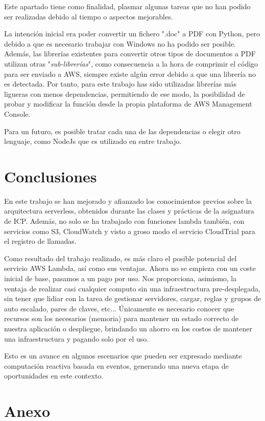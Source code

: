 \documentclass[
]{article}
\begin{document}
Este apartado tiene como finalidad, plasmar algunas tareas que no han
podido ser realizadas debido al tiempo o aspectos mejorables.

La intención inicial era poder convertir un fichero ".doc" a PDF con
Python, pero debido a que es necesario trabajar con Windows no ha podido
ser posible. Además, las librerías existentes para convertir otros tipos
de documentos a PDF utilizan otras "\emph{sub-librerías}", como
consecuencia a la hora de comprimir el código para ser enviado a AWS,
siempre existe algún error debido a que una librería no es detectada.
Por tanto, para este trabajo has sido utilizadas librerías más ligueras
con menos dependencias, permitiendo de ese modo, la posibilidad de
probar y modificar la función desde la propia plataforma de AWS
Management Console.

Para un futuro, es posible tratar cada una de las dependencias o elegir
otro lenguaje, como NodeJs que es utilizado en entre trabajo.

\hypertarget{header-n210}{%
\section{Conclusiones}\label{header-n210}}
En este trabajo se han mejorado y afianzado los conocimientos previos sobre la arquitectura serverless, obtenidos durante las clases y prácticas de la asignatura de ICP. Además, no solo se ha trabajado con funciones lambda también, con servicios como S3, CloudWatch y visto a groso modo el servicio CloudTrial para el registro de llamadas. 

Como resultado del trabajo realizado, es más claro el posible potencial del servicio AWS Lambda, así como sus ventajas. Ahora no se empieza con un coste inicial de base, pasamos a un pago por uso. Nos proporciona, asimismo, la ventaja de realizar casi cualquier computo sin una infraestructura pre-desplegada, sin tener que lidiar con la tarea de gestionar servidores, cargar, reglas y grupos de auto escalado, pares de claves, etc...  Únicamente es necesario conocer que recursos son los necesarios (memoria) para mantener un estado correcto de nuestra aplicación o despliegue, brindando un ahorro en los costos de mantener una infraestructura y pagando solo por el uso.  

Esto es un avance en algunos escenarios que pueden ser expresado mediante computación reactiva basada en eventos, generando una nueva etapa de oportunidades en este contexto.

\newpage
\hypertarget{header-n212}{%
\section{Anexo}\label{header-n212}}
\end{document}
